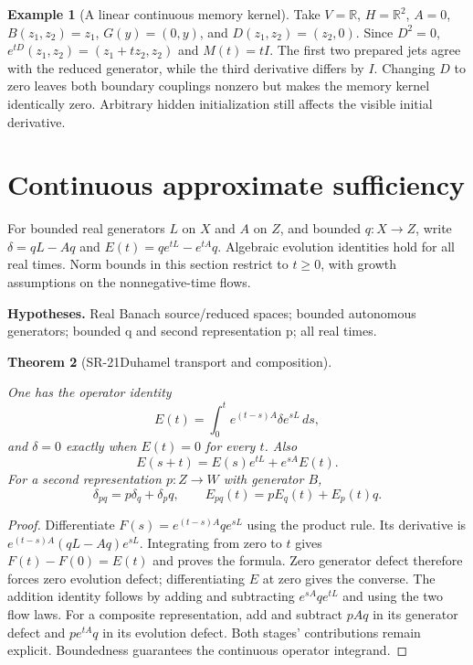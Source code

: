 \documentclass[11pt]{article}
\newtheorem{theorem}{Theorem}[section]
\theoremstyle{definition}\newtheorem{definition}[theorem]{Definition}
\newtheorem{example}[theorem]{Example}
\theoremstyle{remark}\newtheorem{remark}[theorem]{Remark}
\newcommand{\RR}{\mathbb R}\newcommand{\QQ}{\mathbb Q}
\begin{document}
\begin{example}[A linear continuous memory kernel]
Take $V=\RR$, $H=\RR^2$, $A=0$, $B(z_1,z_2)=z_1$,
$G(y)=(0,y)$, and $D(z_1,z_2)=(z_2,0)$. Since $D^2=0$,
$e^{tD}(z_1,z_2)=(z_1+tz_2,z_2)$ and $M(t)=tI$.
The first two prepared jets agree with the reduced generator, while the
third derivative differs by $I$. Changing $D$ to zero leaves both boundary
couplings nonzero but makes the memory kernel identically zero.
Arbitrary hidden initialization still affects the visible initial derivative.
\end{example}


\section{Continuous approximate sufficiency}

For bounded real generators $L$ on $X$ and $A$ on $Z$, and bounded $q:X\to Z$,
write $\delta=qL-Aq$ and $E(t)=qe^{tL}-e^{tA}q$.
Algebraic evolution identities hold for all real times. Norm bounds in this
section restrict to $t\ge0$, with growth assumptions on the nonnegative-time flows.


\par{\small\textbf{Hypotheses.} Real Banach source/\allowbreak reduced spaces; bounded autonomous generators; bounded q and second representation p; all real times.}\par

\begin{theorem}[SR-21\quad Duhamel transport and composition]\label{SR-21}

One has the operator identity
\[
E(t)=\int_0^t e^{(t-s)A}\delta e^{sL}\,ds,
\]
and $\delta=0$ exactly when $E(t)=0$ for every $t$. Also
\[
E(s+t)=E(s)e^{tL}+e^{sA}E(t).
\]
For a second representation $p:Z\to W$ with generator $B$,
\[
\delta_{pq}=p\delta_q+\delta_pq,\qquad
E_{pq}(t)=pE_q(t)+E_p(t)q.
\]

\end{theorem}
\begin{proof}

Differentiate $F(s)=e^{(t-s)A}qe^{sL}$ using the product rule. Its derivative
is $e^{(t-s)A}(qL-Aq)e^{sL}$. Integrating from zero to $t$ gives
$F(t)-F(0)=E(t)$ and proves the formula. Zero generator defect therefore
forces zero evolution defect; differentiating $E$ at zero gives the
converse. The addition identity follows by adding and subtracting
$e^{sA}qe^{tL}$ and using the two flow laws.
For a composite representation, add and subtract $pAq$ in its generator
defect and $pe^{tA}q$ in its evolution defect. Both stages' contributions
remain explicit. Boundedness guarantees the continuous operator integrand.

\end{proof}
\end{document}

